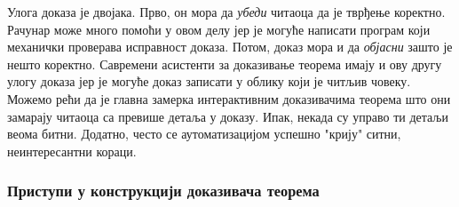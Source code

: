 Улога доказа је двојака. Прво, он мора да \emph{убеди} читаоца да је
тврђење коректно. Рачунар може много помоћи у овом делу јер је могуће
написати програм који механички проверава исправност доказа. Потом,
доказ мора и да \emph{објасни} зашто је нешто коректно. Савремени
асистенти за доказивање теорема имају и ову другу улогу доказа јер је
могуће доказ записати у облику који је читљив човеку. Можемо рећи да
је главна замерка интерактивним доказивачима теорема што они замарају
читаоца са превише детаља у доказу. Ипак, некада су управо ти детаљи
веома битни. Додатно, често се аутоматизацијом успешно "крију" ситни,
неинтересантни кораци.

\subsubsection{Приступи у конструкцији доказивача теорема}

